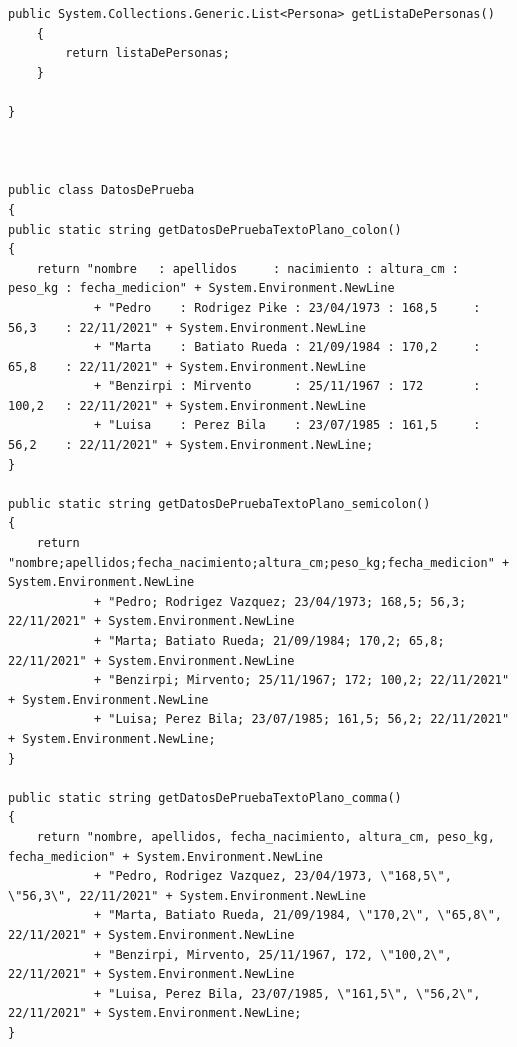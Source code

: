 \documentclass[spanish,12pt,a4paper,final,oneside]{book}
\begin{document}
\begin{lstlisting}[frame=single, caption=lenguaje C\#]
    public System.Collections.Generic.List<Persona> getListaDePersonas()
    {
        return listaDePersonas;
    }
    
}



public class DatosDePrueba
{
public static string getDatosDePruebaTextoPlano_colon()
{
    return "nombre   : apellidos     : nacimiento : altura_cm : peso_kg : fecha_medicion" + System.Environment.NewLine
            + "Pedro    : Rodrigez Pike : 23/04/1973 : 168,5     : 56,3    : 22/11/2021" + System.Environment.NewLine
            + "Marta    : Batiato Rueda : 21/09/1984 : 170,2     : 65,8    : 22/11/2021" + System.Environment.NewLine
            + "Benzirpi : Mirvento      : 25/11/1967 : 172       : 100,2   : 22/11/2021" + System.Environment.NewLine
            + "Luisa    : Perez Bila    : 23/07/1985 : 161,5     : 56,2    : 22/11/2021" + System.Environment.NewLine;
}

public static string getDatosDePruebaTextoPlano_semicolon()
{
    return "nombre;apellidos;fecha_nacimiento;altura_cm;peso_kg;fecha_medicion" + System.Environment.NewLine
            + "Pedro; Rodrigez Vazquez; 23/04/1973; 168,5; 56,3; 22/11/2021" + System.Environment.NewLine
            + "Marta; Batiato Rueda; 21/09/1984; 170,2; 65,8; 22/11/2021" + System.Environment.NewLine
            + "Benzirpi; Mirvento; 25/11/1967; 172; 100,2; 22/11/2021" + System.Environment.NewLine
            + "Luisa; Perez Bila; 23/07/1985; 161,5; 56,2; 22/11/2021" + System.Environment.NewLine;
}

public static string getDatosDePruebaTextoPlano_comma()
{
    return "nombre, apellidos, fecha_nacimiento, altura_cm, peso_kg, fecha_medicion" + System.Environment.NewLine
            + "Pedro, Rodrigez Vazquez, 23/04/1973, \"168,5\", \"56,3\", 22/11/2021" + System.Environment.NewLine
            + "Marta, Batiato Rueda, 21/09/1984, \"170,2\", \"65,8\", 22/11/2021" + System.Environment.NewLine
            + "Benzirpi, Mirvento, 25/11/1967, 172, \"100,2\", 22/11/2021" + System.Environment.NewLine
            + "Luisa, Perez Bila, 23/07/1985, \"161,5\", \"56,2\", 22/11/2021" + System.Environment.NewLine;
}

\end{lstlisting}
\end{document}
